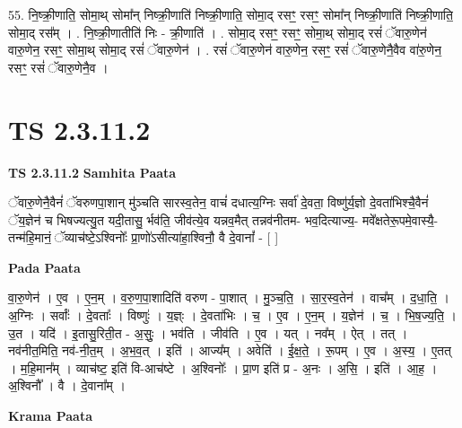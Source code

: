 \documentclass[17pt]{extarticle}
\begin{document}
55. नि॒ष्क्री॒णाति॒ सोमा॒थ् सोमा᳚न् निष्क्री॒णाति॑ निष्क्री॒णाति॒ सोमा॒द् रसꣳ॒॒ रसꣳ॒॒ सोमा᳚न् निष्क्री॒णाति॑ निष्क्री॒णाति॒ सोमा॒द् रस᳚म् । . नि॒ष्क्री॒णातीति॑ निः - क्री॒णाति॑ । . सोमा॒द् रसꣳ॒॒ रसꣳ॒॒ सोमा॒थ् सोमा॒द् रसं॑ ॅवारु॒णेन॑ वारु॒णेन॒ रसꣳ॒॒ सोमा॒थ् सोमा॒द् रसं॑ ॅवारु॒णेन॑ । . रसं॑ ॅवारु॒णेन॑ वारु॒णेन॒ रसꣳ॒॒ रसं॑ ॅवारु॒णेनै॒वैव वा॑रु॒णेन॒ रसꣳ॒॒ रसं॑ ॅवारु॒णेनै॒व । \newline
\pagebreak
{}
\section*{ TS 2.3.11.2 }

\textbf{TS 2.3.11.2 } \newline
\textbf{Samhita Paata} \newline

ॅवारु॒णेनै॒वैनं॑ ॅवरुणपा॒शान् मु॑ञ्चति सारस्व॒तेन॒ वाचं॑ दधात्य॒ग्निः सर्वा॑ दे॒वता॒ विष्णु॑र्य॒ज्ञो दे॒वता॑भिश्चै॒वैनं॑ ॅय॒ज्ञेन॑ च भिषज्यत्यु॒त यदी॒तासु॒ र्भव॑ति॒ जीव॑त्ये॒व यन्नव॒मैत् तन्नव॑नीतम- भव॒दित्याज्य॒- मवे᳚क्षतेरू॒पमे॒वास्यै॒-तन्म॑हि॒मानं॒ ॅव्याच॑ष्टे॒ऽश्विनोः᳚ प्रा॒णो॑ऽसीत्या॑हा॒श्विनौ॒ वै दे॒वानां᳚ - [  ] \newline

\textbf{Pada Paata} \newline

वा॒रु॒णेन॑ । ए॒व । ए॒न॒म् । व॒रु॒ण॒पा॒शादिति॑ वरुण - पा॒शात् । मु॒ञ्च॒ति॒ । सा॒र॒स्व॒तेन॑ । वाच᳚म् । द॒धा॒ति॒ । अ॒ग्निः । सर्वाः᳚ । दे॒वताः᳚ । विष्णुः॑ । य॒ज्ञ्ः । दे॒वता॑भिः । च॒ । ए॒व । ए॒न॒म् । य॒ज्ञेन॑ । च॒ । भि॒ष॒ज्य॒ति॒ । उ॒त । यदि॑ । इ॒तासु॒रिती॒त - अ॒सुः॒ । भव॑ति । जीव॑ति । ए॒व । यत् । नव᳚म् । ऐत् । तत् । नव॑नीत॒मिति॒ नव॑-नी॒त॒म् । अ॒भ॒व॒त् । इति॑ । आज्य᳚म् । अवेति॑ । ई॒क्ष॒ते॒ । रू॒पम् । ए॒व । अ॒स्य॒ । ए॒तत् । म॒हि॒मान᳚म् । व्याच॑ष्ट॒ इति॑ वि-आच॑ष्टे । अ॒श्विनोः᳚ । प्रा॒ण इति॑ प्र - अ॒नः । अ॒सि॒ । इति॑ । आ॒ह॒ । अ॒श्विनौ᳚ । वै । दे॒वाना᳚म् ।  \newline


\textbf{Krama Paata} \newline
\end{document}

